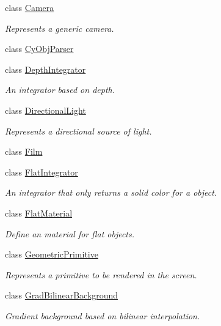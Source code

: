 \begin{DoxyCompactItemize}
class \mbox{\hyperlink{classomg_1_1_camera}{Camera}}
\begin{DoxyCompactList}\small\item\em Represents a generic camera. \end{DoxyCompactList}\item 
class \mbox{\hyperlink{classomg_1_1_cy_obj_parser}{Cy\+Obj\+Parser}}
\item 
class \mbox{\hyperlink{classomg_1_1_depth_integrator}{Depth\+Integrator}}
\begin{DoxyCompactList}\small\item\em An integrator based on depth. \end{DoxyCompactList}\item 
class \mbox{\hyperlink{classomg_1_1_directional_light}{Directional\+Light}}
\begin{DoxyCompactList}\small\item\em Represents a directional source of light. \end{DoxyCompactList}\item 
class \mbox{\hyperlink{classomg_1_1_film}{Film}}
\item 
class \mbox{\hyperlink{classomg_1_1_flat_integrator}{Flat\+Integrator}}
\begin{DoxyCompactList}\small\item\em An integrator that only returns a solid color for a object. \end{DoxyCompactList}\item 
class \mbox{\hyperlink{classomg_1_1_flat_material}{Flat\+Material}}
\begin{DoxyCompactList}\small\item\em Define an material for flat objects. \end{DoxyCompactList}\item 
class \mbox{\hyperlink{classomg_1_1_geometric_primitive}{Geometric\+Primitive}}
\begin{DoxyCompactList}\small\item\em Represents a primitive to be rendered in the screen. \end{DoxyCompactList}\item 
class \mbox{\hyperlink{classomg_1_1_grad_bilinear_background}{Grad\+Bilinear\+Background}}
\begin{DoxyCompactList}\small\item\em Gradient background based on bilinear interpolation. \end{DoxyCompactList}\item 

\end{DoxyCompactItemize}
